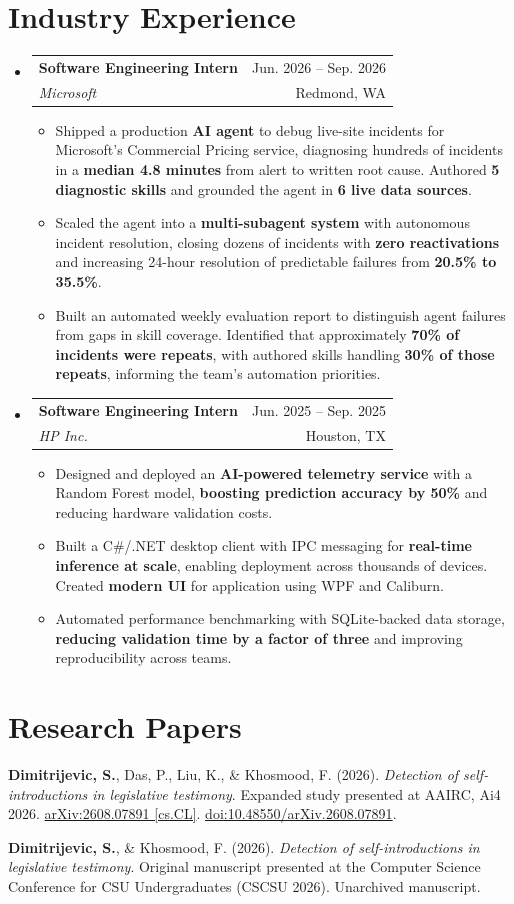 \documentclass[letterpaper,11pt]{article}
\makeatletter
\newcommand{\resumeItem}[1]{\item\small{{#1 \vspace{-2pt}}}}
\newcommand{\resumeSubheading}[4]{
  \vspace{-2pt}\item
  \begin{tabular*}{0.97\textwidth}[t]{l@{\extracolsep{\fill}}r}
    \textbf{#1} & #2 \\
    \textit{\small #3} & {\small #4} \\
  \end{tabular*}\vspace{-7pt}
}
\newcommand{\resumeSubHeadingListStart}{\begin{itemize}[leftmargin=0.15in, label={}]}
\newcommand{\resumeSubHeadingListEnd}{\end{itemize}}
\newcommand{\resumeItemListStart}{\begin{itemize}[label={$\bullet$}]}
\newcommand{\resumeItemListEnd}{\end{itemize}\vspace{-5pt}}
\makeatother
\begin{document}
\section{Industry Experience}
\resumeSubHeadingListStart
  \resumeSubheading
    {Software Engineering Intern}{Jun. 2026 -- Sep. 2026}
    {Microsoft}{Redmond, WA}
    \resumeItemListStart
      \resumeItem{Shipped a production \textbf{AI agent} to debug live-site incidents for Microsoft's Commercial Pricing service, diagnosing hundreds of incidents in a \textbf{median 4.8 minutes} from alert to written root cause. Authored \textbf{5 diagnostic skills} and grounded the agent in \textbf{6 live data sources}.}
      \resumeItem{Scaled the agent into a \textbf{multi-subagent system} with autonomous incident resolution, closing dozens of incidents with \textbf{zero reactivations} and increasing 24-hour resolution of predictable failures from \textbf{20.5\% to 35.5\%}.}
      \resumeItem{Built an automated weekly evaluation report to distinguish agent failures from gaps in skill coverage. Identified that approximately \textbf{70\% of incidents were repeats}, with authored skills handling \textbf{30\% of those repeats}, informing the team's automation priorities.}
    \resumeItemListEnd
  \resumeSubheading
    {Software Engineering Intern}{Jun. 2025 -- Sep. 2025}
    {HP Inc.}{Houston, TX}
    \resumeItemListStart
      \resumeItem{Designed and deployed an \textbf{AI-powered telemetry service} with a Random Forest model, \textbf{boosting prediction accuracy by 50\%} and reducing hardware validation costs.}
    \resumeItem{Built a C\#/.NET desktop client with IPC messaging for \textbf{real-time inference at scale}, enabling deployment across thousands of devices. Created \textbf{modern UI} for application using WPF and Caliburn.}
    \resumeItem{Automated performance benchmarking with SQLite-backed data storage, \textbf{reducing validation time by a factor of three} and improving reproducibility across teams.}
    \resumeItemListEnd
\resumeSubHeadingListEnd

\section{Research Papers}
\begin{enumerate}[leftmargin=0.3in, label={[\arabic*]}, itemsep=3pt]
  \item \hypertarget{paper-vegas}{}\small \textbf{Dimitrijevic, S.}, Das, P., Liu, K., \& Khosmood, F. (2026). \textit{Detection of self-introductions in legislative testimony}. Expanded study presented at AAIRC, Ai4 2026. \href{https://arxiv.org/abs/2608.07891}{arXiv:2608.07891 [cs.CL]}. \href{https://doi.org/10.48550/arXiv.2608.07891}{doi:10.48550/arXiv.2608.07891}.
  \item \hypertarget{paper-cscsu}{}\small \textbf{Dimitrijevic, S.}, \& Khosmood, F. (2026). \textit{Detection of self-introductions in legislative testimony}. Original manuscript presented at the Computer Science Conference for CSU Undergraduates (CSCSU 2026). Unarchived manuscript.
\end{enumerate}
\end{document}
